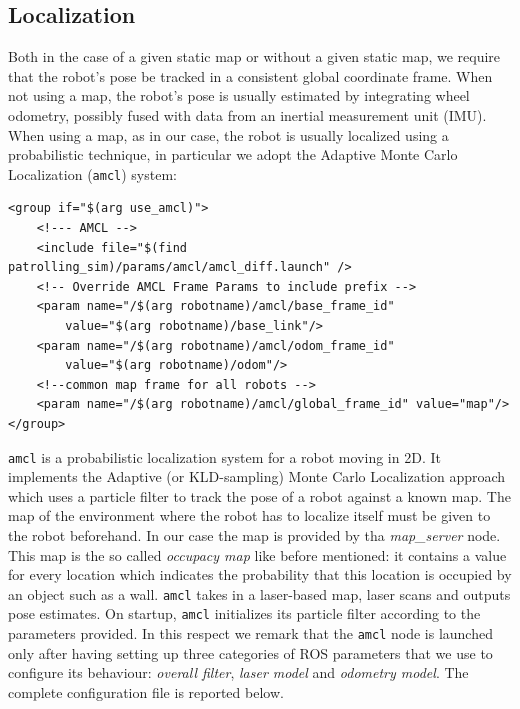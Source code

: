 \subsection{Localization}
Both in the case of a given static map or without a given static map, we
require that the robot’s pose be tracked in a consistent global coordinate frame.
When not using a map, the robot’s pose is usually estimated by integrating
wheel odometry, possibly fused with data from an inertial measurement unit
(IMU). When using a map, as in our case, the robot is usually localized using
a probabilistic technique, in particular we adopt the Adaptive Monte Carlo
Localization (\texttt{amcl}) system:
\begin{lstlisting}
<group if="$(arg use_amcl)">
    <!--- AMCL -->
    <include file="$(find patrolling_sim)/params/amcl/amcl_diff.launch" />       
    <!-- Override AMCL Frame Params to include prefix -->
    <param name="/$(arg robotname)/amcl/base_frame_id" 
        value="$(arg robotname)/base_link"/>
    <param name="/$(arg robotname)/amcl/odom_frame_id" 
        value="$(arg robotname)/odom"/>
    <!--common map frame for all robots -->
    <param name="/$(arg robotname)/amcl/global_frame_id" value="map"/> 
</group>
\end{lstlisting}
\texttt{amcl} is a probabilistic localization system for a robot moving in 2D.
It implements the Adaptive (or KLD-sampling) Monte Carlo Localization
approach which uses a particle filter to track the pose of a robot against
a known map. The map of the environment where the robot has to localize
itself must be given to the robot beforehand. In our case the map is provided
by tha \textit{map\_server} node. This map is the so called \textit{occupacy map}
like before mentioned: it contains a value for every location which indicates the 
probability that this location is occupied by an object such as a wall. 
\texttt{amcl} takes in a laser-based map, laser scans and outputs pose estimates.
On startup, \texttt{amcl} initializes its particle filter according to the parameters
provided. In this respect we remark that the \texttt{amcl} node is launched only 
after having setting up three categories of ROS parameters that we use to configure 
its behaviour: \textit{overall filter}, \textit{laser model} and \textit{odometry model}.
The complete configuration file is reported below.
